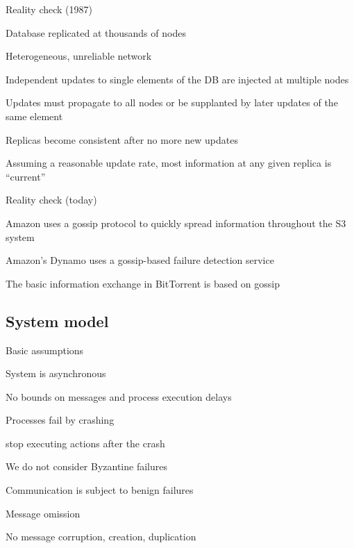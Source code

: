 \begin{frame}{Reality check (1987)}
\BIL
\item Database replicated at thousands of nodes 
\item Heterogeneous, unreliable network
\item Independent updates to single elements of the DB are injected at multiple nodes
\item Updates must propagate to all nodes or be supplanted by later updates of the same element
\item Replicas become consistent after no more new updates
\item Assuming a reasonable update rate, most information at any given replica is “current”	
\EIL

\end{frame}

\begin{frame}{Reality check (today)}

\BIL
\item Amazon uses a gossip protocol to quickly spread information throughout the S3 system
\item Amazon's Dynamo uses a gossip-based failure detection service
\item The basic information exchange in BitTorrent is based on gossip
\EIL	

\end{frame}
	
\subsection{System model}

\begin{frame}{Basic assumptions}
	
\BIL

\item \alert{System is asynchronous}
	\BI
	\item No bounds on messages and process execution delays
	\EI
	
\item \alert{Processes fail by crashing}
	\BI
	\item stop executing actions after the crash
	\item We do not consider Byzantine failures
	\EI
	
\item \alert{Communication is subject to benign failures}
 \BI
 \item Message omission
 \item No message corruption, creation, duplication
 \EI
	
\EIL

\end{frame}

